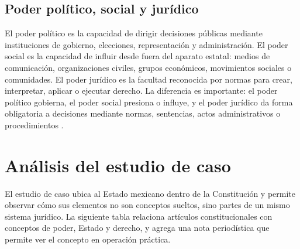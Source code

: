 \documentclass[
spanish,
letterpaper, oneside
]{article}
\begin{document}
	\subsection{Poder político, social y jurídico}
	
	El poder político es la capacidad de dirigir decisiones públicas mediante instituciones de gobierno, elecciones, representación y administración. El poder social es la capacidad de influir desde fuera del aparato estatal: medios de comunicación, organizaciones civiles, grupos económicos, movimientos sociales o comunidades. El poder jurídico es la facultad reconocida por normas para crear, interpretar, aplicar o ejecutar derecho. La diferencia es importante: el poder político gobierna, el poder social presiona o influye, y el poder jurídico da forma obligatoria a decisiones mediante normas, sentencias, actos administrativos o procedimientos \citep{paredes2020,kelsen1982}.
	
	\section{Análisis del estudio de caso}
	
	El estudio de caso ubica al Estado mexicano dentro de la Constitución y permite observar cómo sus elementos no son conceptos sueltos, sino partes de un mismo sistema jurídico. La siguiente tabla relaciona artículos constitucionales con conceptos de poder, Estado y derecho, y agrega una nota periodística que permite ver el concepto en operación práctica.
	
\end{document}

